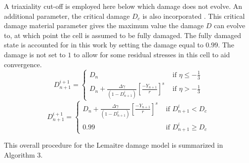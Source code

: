 \documentclass[sn-mathphys,Numbered,draft]{sn-jnl}%
\begin{document}
A triaxiality cut-off is employed here \cite{bouchard_enhanced_2011} below which damage does not evolve. An additional parameter, the critical damage $D_c$ is also incorporated \cite{lemaitre_continuous_1985}. This critical damage material parameter gives the maximum value the damage $D$ can evolve to, at which point the cell is assumed to be fully damaged. The fully damaged state is accounted for in this work by setting the damage equal to $0.99$. The damage is not set to $1$ to allow for some residual stresses in this cell to aid convergence.
\begin{equation}
D^{i+1}_{n+1}= \begin{cases}D_n & \text { if } \eta\leq-\frac{1}{3} \\ D_n+\frac{\Delta\gamma}{\left(1-D^{i}_{n+1}\right)}\left[\frac{-Y_{n+1}}{r}\right]^s & \text { if } \eta>-\frac{1}{3}\end{cases}
\end{equation}
\begin{equation}
\label{DamageUpdateEquation}
D^{i+1}_{n+1}= \begin{cases} D_n+\frac{\Delta\gamma}{\left(1-D^{i}_{n+1}\right)}\left[\frac{-Y_{n+1}}{r}\right]^s & \text { if } D^{i}_{n+1}<D_c \\ 0.99 & \text { if } D^{i}_{n+1} \geq D_c \end{cases}
\end{equation}

This overall procedure for the Lemaitre damage model is summarized in Algorithm 3.
\end{document}

